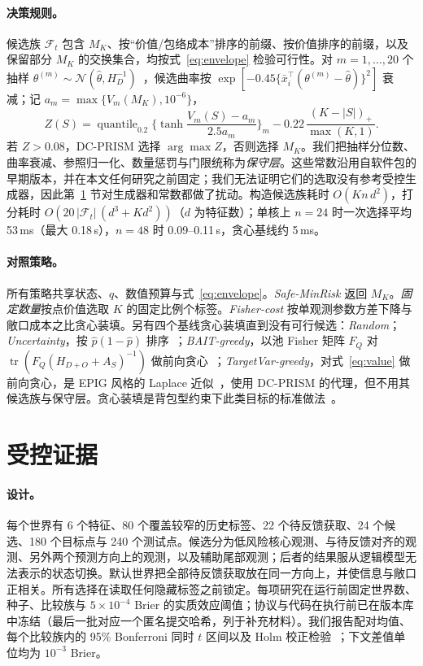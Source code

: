 \documentclass[runningheads]{llncs}
\begin{document}
\paragraph{决策规则。}候选族 $\mathcal F_t$ 包含 $M_K$、按“价值/包络成本”排序的前缀、按价值排序的前缀，以及保留部分 $M_K$ 的交换集合，均按式~\eqref{eq:envelope} 检验可行性。对 $m=1,\dots,20$ 个抽样 $\theta^{(m)}\sim\mathcal N(\widehat\theta,H_D^{-1})$~\cite{mackay1992practical}，候选曲率按 $\exp[-0.45\{\bar x_i^\top(\theta^{(m)}-\widehat\theta)\}^2]$ 衰减；记 $a_m=\max\{V_m(M_K),10^{-6}\}$，
\begin{equation}
 Z(S)=\operatorname{quantile}_{0.2}\Big\{\tanh\frac{V_m(S)-a_m}{2.5a_m}\Big\}_m-0.22\,\frac{(K-|S|)_+}{\max(K,1)} .\label{eq:score}
\end{equation}
若 $Z>0.08$，DC-PRISM 选择 $\arg\max Z$，否则选择 $M_K$。我们把抽样分位数、曲率衰减、参照归一化、数量惩罚与门限统称为\emph{保守层}。这些常数沿用自软件包的早期版本，并在本文任何研究之前固定；我们无法证明它们的选取没有参考受控生成器，因此第~\ref{sec:controlled} 节对生成器和常数都做了扰动。构造候选族耗时 $O(Kn\,d^2)$，打分耗时 $O(20\,|\mathcal F_t|\,(d^3+Kd^2))$（$d$ 为特征数）；单核上 $n=24$ 时一次选择平均 53\,ms（最大 0.18\,s），$n=48$ 时 0.09--0.11\,s，贪心基线约 5\,ms。

\paragraph{对照策略。}所有策略共享状态、$q$、数值预算与式~\eqref{eq:envelope}。\emph{Safe-MinRisk} 返回 $M_K$。\emph{固定数量}按点价值选取 $K$ 的固定比例个标签。\emph{Fisher-cost} 按单观测参数方差下降与敞口成本之比贪心装填。另有四个基线贪心装填直到没有可行候选：\emph{Random}；\emph{Uncertainty}，按 $\widehat p(1-\widehat p)$ 排序~\cite{lewis1994sequential}；\emph{BAIT-greedy}，以池 Fisher 矩阵 $F_Q$ 对 $\operatorname{tr}(F_Q(H_{D+O}+A_S)^{-1})$ 做前向贪心~\cite{ash2021fishing}；\emph{TargetVar-greedy}，对式~\eqref{eq:value} 做前向贪心，是 EPIG 风格的 Laplace 近似~\cite{bickfordsmith2023prediction}，使用 DC-PRISM 的代理，但不用其候选族与保守层。贪心装填是背包型约束下此类目标的标准做法~\cite{krause2005near,sviridenko2004note}。

\section{受控证据}
\label{sec:controlled}
\paragraph{设计。}每个世界有 6 个特征、80 个覆盖较窄的历史标签、22 个待反馈获取、24 个候选、180 个目标点与 240 个测试点。候选分为低风险核心观测、与待反馈对齐的观测、另外两个预测方向上的观测，以及辅助尾部观测；后者的结果服从逻辑模型无法表示的状态切换。默认世界把全部待反馈获取放在同一方向上，并使信息与敞口正相关。所有选择在读取任何隐藏标签之前锁定。每项研究在运行前固定世界数、种子、比较族与 $5\times10^{-4}$ Brier 的实质效应阈值；协议与代码在执行前已在版本库中冻结（最后一批对应一个匿名提交哈希，列于补充材料）。我们报告配对均值、每个比较族内的 95\% Bonferroni 同时 $t$ 区间以及 Holm 校正检验~\cite{holm1979simple}；下文差值单位均为 $10^{-3}$ Brier。
\end{document}
